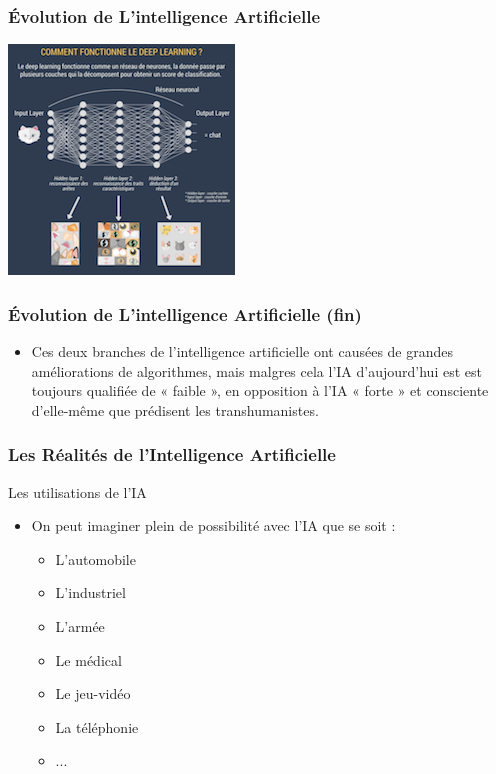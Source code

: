 \documentclass{beamer}
\begin{document}
	\begin{frame}[fragile]
	\frametitle{Évolution de L'intelligence  Artificielle}
	
	\centerline{\includegraphics{deeplearning.png}}%
	
	\end{frame}
	
		\begin{frame}[fragile]
	\frametitle{Évolution de L'intelligence  Artificielle (fin)}
	\begin{itemize}
		\item Ces deux branches de l'intelligence artificielle ont causées de grandes améliorations de algorithmes, mais malgres cela l'IA d'aujourd'hui est est toujours qualifiée de « faible », en opposition à l’IA « forte » et consciente d’elle-même que prédisent les transhumanistes.

	\end{itemize}
	\end{frame}
	
	
	\begin{frame}[fragile]
	\frametitle{Les Réalités de l'Intelligence Artificielle}
	\begin{block}{Les utilisations de l'IA}
	\begin{itemize}
	\itemsep1em
		\item On peut imaginer plein de possibilité avec l'IA que se soit :
		\begin{itemize}
		\itemsep1em
		\item L'automobile
		\item L'industriel
		\item L'armée
		\item Le médical
		\item Le jeu-vidéo
		\item La téléphonie
		\item ...
		\end{itemize}
		\end{itemize}
	\end{block}
	\end{frame}
	
\end{document}
